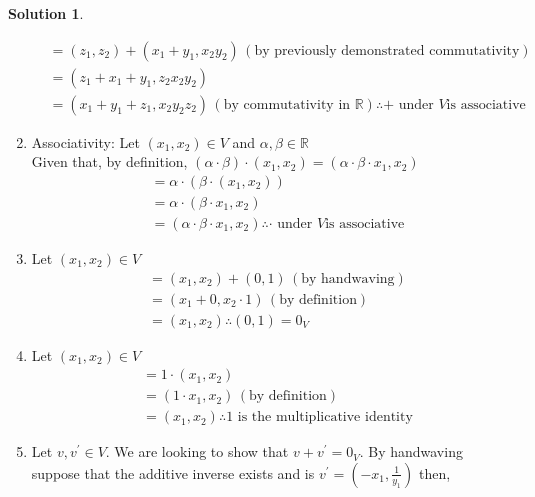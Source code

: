 \documentclass[10pt]{article}
\theoremstyle{definition}
\newtheorem{soln}{Solution}
\begin{document}
\begin{soln}
\begin{enumerate}[label=(\roman*)]
\begin{align*}
             & =(z_1, z_2) + (x_1 + y_1, x_2y_2) \, (\text{by previously demonstrated commutativity})                                         \\
             & =(z_1 + x_1 + y_1, z_2x_2y_2)                                                                                                  \\
             & =(x_1 + y_1 + z_1 , x_2y_2z_2) \, (\text{by commutativity in } \mathbb{R}) \therefore + \text{ under } V \text{is associative}
          \end{align*}
    \item Associativity: Let $(x_1, x_2)\in V$ and $\alpha,\beta\in\mathbb{R}$\\
          Given that, by definition, $(\alpha\cdot\beta)\cdot(x_1, x_2)=(\alpha\cdot\beta\cdot x_1, x_2)$
          \begin{align*}
             & =\alpha\cdot(\beta\cdot(x_1, x_2))                                                         \\
             & =\alpha\cdot(\beta\cdot x_1, x_2)                                                          \\
             & =(\alpha\cdot\beta\cdot x_1, x_2)  \therefore \cdot \text{ under } V \text{is associative}
          \end{align*}
    \item Let $(x_1, x_2)\in V$
          \begin{align*}
             & = (x_1, x_2) + (0,1) \, (\text{by handwaving})  \\
             & = (x_1+0, x_2\cdot 1) \, (\text{by definition}) \\
             & = (x_1, x_2) \therefore (0,1)=0_V
          \end{align*}
    \item Let $(x_1, x_2)\in V$
          \begin{align*}
             & = 1\cdot(x_1, x_2)                                               \\
             & = (1\cdot x_1, x_2) \, (\text{by definition})                    \\
             & = (x_1, x_2) \therefore 1 \text{ is the multiplicative identity}
          \end{align*}
    \item Let $v,v^\prime\in V$. We are looking to show that $v+v^\prime=0_V$. By handwaving suppose that the additive inverse exists and is $v^\prime=\left(-x_1, \frac{1}{y_1}\right)$ then,
          \begin{align*}

\end{align*}
\end{enumerate}
\end{soln}
\end{document}
